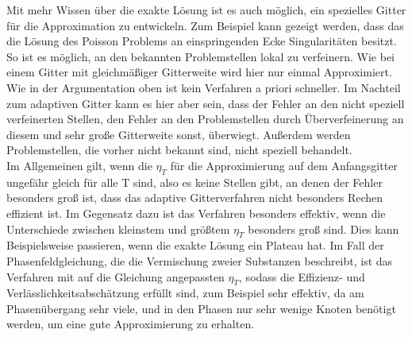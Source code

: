 Mit mehr Wissen über die exakte Lösung ist es auch möglich, ein spezielles Gitter für die Approximation zu entwickeln. Zum Beispiel kann gezeigt werden, dass das die Lösung des Poisson Problems an einspringenden Ecke Singularitäten besitzt. So ist es möglich, an den bekannten Problemstellen lokal zu verfeinern. Wie bei einem Gitter mit gleichmäßiger Gitterweite wird hier nur einmal Approximiert. Wie in der Argumentation oben ist kein Verfahren a priori schneller. Im Nachteil zum adaptiven Gitter kann es hier aber sein, dass der Fehler an den nicht speziell verfeinerten Stellen, den Fehler an den Problemstellen durch Überverfeinerung an diesem und sehr große Gitterweite sonst, überwiegt. Außerdem werden Problemstellen, die vorher nicht bekannt sind, nicht speziell behandelt. \\
Im Allgemeinen gilt, wenn die $\eta_{T}$ für die Approximierung auf dem Anfangsgitter ungefähr gleich für alle T sind, also es keine Stellen gibt, an denen der Fehler besonders groß ist, dass das adaptive Gitterverfahren nicht besonders Rechen effizient ist. Im Gegensatz dazu ist das Verfahren besonders effektiv, wenn die Unterschiede zwischen kleinstem und größtem $\eta_{T}$ besonders groß sind. Dies kann Beispielsweise passieren, wenn die exakte Lösung ein Plateau hat. Im Fall der Phasenfeldgleichung, die die Vermischung zweier Substanzen beschreibt, ist das Verfahren mit auf die Gleichung angepassten $\eta_{T}$, sodass die Effizienz- und Verlässlichkeitsabschätzung erfüllt sind, zum Beispiel sehr effektiv, da am Phasenübergang sehr viele, und in den Phasen nur sehr wenige Knoten benötigt werden, um eine gute Approximierung zu erhalten.